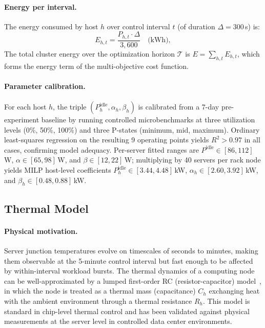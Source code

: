 \documentclass[a4paper,fleqn]{cas-dc}
\begin{document}
\paragraph{Energy per interval.}
The energy consumed by host $h$ over control interval $t$ (of duration $\Delta = 300$\,s) is:
\begin{equation}
\label{eq:energy}
E_{h,t} = \frac{P_{h,t} \cdot \Delta}{3{,}600} \quad \text{(kWh)},
\end{equation}
The total cluster energy over the optimization horizon $\mathcal{T}$ is $E = \sum_{h,t} E_{h,t}$, which forms the energy term of the multi-objective cost function.

\paragraph{Parameter calibration.}
For each host $h$, the triple $(P^{\mathrm{idle}}_h, \alpha_h, \beta_h)$ is calibrated from a 7-day pre-experiment baseline by running controlled microbenchmarks at three utilization levels (0\%, 50\%, 100\%) and three P-states (minimum, mid, maximum). Ordinary least-squares regression on the resulting 9 operating points yields $R^2 > 0.97$ in all cases, confirming model adequacy. Per-server fitted ranges are $P^{\mathrm{idle}}\in[86,112]$\,W, $\alpha\in[65,98]$\,W, and $\beta\in[12,22]$\,W; multiplying by 40 servers per rack node yields MILP host-level coefficients $P^{\mathrm{idle}}_h\in[3.44,4.48]$\,kW, $\alpha_h\in[2.60,3.92]$\,kW, and $\beta_h\in[0.48,0.88]$\,kW.

\subsection{Thermal Model}
\label{sec:thermal_model}

\paragraph{Physical motivation.}
Server junction temperatures evolve on timescales of seconds to minutes, making them observable at the 5-minute control interval but fast enough to be affected by within-interval workload bursts. The thermal dynamics of a computing node can be well-approximated by a lumped first-order RC (resistor-capacitor) model~\cite{ref-tilli22,ref-banerjee11}, in which the node is treated as a thermal mass (capacitance) $C_h$ exchanging heat with the ambient environment through a thermal resistance $R_h$. This model is standard in chip-level thermal control and has been validated against physical measurements at the server level in controlled data center environments.
\end{document}
